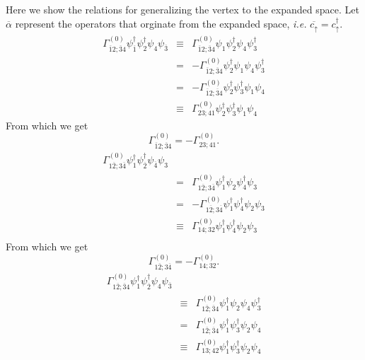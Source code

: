 Here we show the relations for generalizing the vertex to
the expanded space.  Let $\overline{\alpha}$ represent
the operators that orginate from the expanded space, \textit{i.e.}
$\overline{c_{\uparrow}} = c^{\dagger}_{\uparrow}$.
\begin{eqnarray}
\Gamma^{(0)}_{\overline{1}2;\overline{3}4}
\psi^{\dagger}_{\overline{1}}\psi^{\dagger}_2
\psi_4 \psi_{\overline{3}}
& \equiv & 
\Gamma^{(0)}_{\overline{1}2;\overline{3}4}
\psi_1 \psi^{\dagger}_2
\psi_4 \psi^{\dagger}_3 \\
& = & -\Gamma^{(0)}_{\overline{1}2;\overline{3}4}
\psi^{\dagger}_2\psi_1 \psi_4 \psi^{\dagger}_3 \\
& = & -\Gamma^{(0)}_{\overline{1}2;\overline{3}4}
\psi^{\dagger}_2\psi^{\dagger}_3 \psi_1 \psi_4 \\
& \equiv & \Gamma^{(0)}_{23;41}\psi^{\dagger}_2\psi^{\dagger}_3 \psi_1 \psi_4 
\end{eqnarray}
From which we get
\begin{equation}
\Gamma^{(0)}_{\overline{1}2;\overline{3}4} = -\Gamma^{(0)}_{23;41}.
\end{equation}
\begin{eqnarray}
\Gamma^{(0)}_{1\overline{2};3\overline{4}}
\psi^{\dagger}_{1}\psi^{\dagger}_{\overline{2}}
\psi_{\overline{4}} \psi_3 \\
& = & \Gamma^{(0)}_{1\overline{2};3\overline{4}}
\psi^{\dagger}_{1}\psi_{2}
\psi^{\dagger}_{4} \psi_3 \\
& = & - \Gamma^{(0)}_{1\overline{2};3\overline{4}}
\psi^{\dagger}_{1}\psi^{\dagger}_{4}
\psi_{2} \psi_3 \\
& \equiv & \Gamma^{(0)}_{14;32}
\psi^{\dagger}_{1}\psi^{\dagger}_{4}
\psi_{2} \psi_3 \\
\end{eqnarray}
From which we get
\begin{equation}
\Gamma^{(0)}_{1\overline{2};3\overline{4}} = -\Gamma^{(0)}_{14;32}.
\end{equation}
\begin{eqnarray}
\Gamma^{(0)}_{1\overline{2};\overline{3}4}
\psi^{\dagger}_{1}\psi^{\dagger}_{\overline{2}}
\psi_4 \psi_{\overline{3}} \\
& \equiv & \Gamma^{(0)}_{1\overline{2};\overline{3}4}
\psi^{\dagger}_1\psi_2
\psi_4 \psi^{\dagger}_3 \\
& = & \Gamma^{(0)}_{1\overline{2};\overline{3}4}
\psi^{\dagger}_1\psi^{\dagger}_3
\psi_2 \psi_4 \\
& \equiv & \Gamma^{(0)}_{1 3; 4 2}
\psi^{\dagger}_1\psi^{\dagger}_3
\psi_2 \psi_4 
\end{eqnarray}
